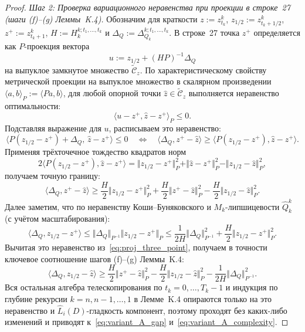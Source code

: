 \documentclass[11pt, a4paper]{article}
\theoremstyle{definition}
\begin{document}
\begin{proof}
\emph{Шаг 2: Проверка вариационного неравенства при проекции в строке~27 (шаги (f)--(g) Леммы~K.4).} Обозначим для краткости $z := z_{t_k}^k$, $z_{1/2} := z_{t_k + 1/2}^k$, $z^+ := z_{t_k + 1}^k$, $H := H_k^{k; t_1, \dots, t_k}$ и $\Delta_Q := \Delta_{Q_k}^{k; t_1, \dots, t_k}$. В строке~27 точка $z^+$ определяется как $P$-проекция вектора
\[
u := z_{1/2} + (H P)^{-1} \Delta_Q
\]
на выпуклое замкнутое множество $\widetilde{\mathcal{C}}_z$. По характеристическому свойству метрической проекции на выпуклое множество в скалярном произведении $\langle a, b \rangle_P := \langle P a, b \rangle$, для любой опорной точки $\hat{z} \in \widetilde{\mathcal{C}}_z$ выполняется неравенство оптимальности:
\[
\langle u - z^+, \hat{z} - z^+ \rangle_P \le 0.
\]
Подставляя выражение для $u$, расписываем это неравенство:
\[
\langle P(z_{1/2} - z^+) + \Delta_Q,\, \hat{z} - z^+ \rangle \le 0 \quad \Longleftrightarrow \quad \langle \Delta_Q, z^+ - \hat{z} \rangle \ge \langle P(z_{1/2} - z^+), \hat{z} - z^+ \rangle.
\]
Применяя трёхточечное тождество квадратов норм
\[
2 \langle P(z_{1/2} - z^+), \hat{z} - z^+ \rangle = \Vert z_{1/2} - z^+ \Vert_P^2 + \Vert \hat{z} - z^+ \Vert_P^2 - \Vert z_{1/2} - \hat{z} \Vert_P^2,
\]
получаем точную границу:
\begin{equation}\label{eq:proj_three_point}
\langle \Delta_Q, z^+ - \hat{z} \rangle \ge \frac{H}{2}\Vert z_{1/2} - z^+ \Vert_P^2 + \frac{H}{2}\Vert z^+ - \hat{z} \Vert_P^2 - \frac{H}{2}\Vert z_{1/2} - \hat{z} \Vert_P^2.
\end{equation}
Далее заметим, что по неравенству Коши--Буняковского и $M_k$-липшицевости $\hat{Q}_k^k$ (с учётом масштабирования):
\[
\langle \Delta_Q, z_{1/2} - z^+ \rangle \le \Vert \Delta_Q \Vert_{P^{-1}} \Vert z_{1/2} - z^+ \Vert_P \le \frac{1}{2H}\Vert \Delta_Q \Vert_{P^{-1}}^2 + \frac{H}{2}\Vert z_{1/2} - z^+ \Vert_P^2.
\]
Вычитая это неравенство из~\eqref{eq:proj_three_point}, получаем в точности ключевое соотношение шагов (f)--(g) Леммы~K.4:
\[
\langle \Delta_Q, z_{1/2} - \hat{z} \rangle \ge \frac{H}{2}\Vert z^+ - \hat{z} \Vert_P^2 - \frac{H}{2}\Vert z_{1/2} - \hat{z} \Vert_P^2 - \frac{1}{2H}\Vert \Delta_Q \Vert_{P^{-1}}^2.
\]
Вся остальная алгебра телескопирования по $t_k = 0, \dots, T_k - 1$ и индукция по глубине рекурсии $k = n, n-1, \dots, 1$ в Лемме~K.4 опираются только на это неравенство и $\widehat{L}_i(D)$-гладкость компонент, поэтому проходят без каких-либо изменений и приводят к~\eqref{eq:variant_A_gap} и~\eqref{eq:variant_A_complexity}.
\end{proof}
\end{document}
